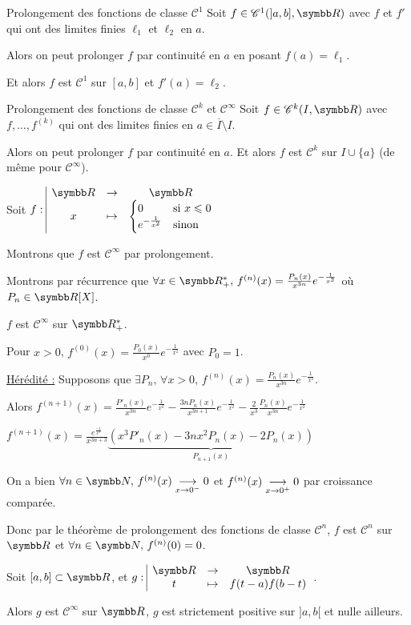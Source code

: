 \begin{theoreme}{Prolongement des fonctions de classe $\mathscr C^1$}{}
    Soit $f \in \mathscr C^1(]a, b], \R)$ avec $f$ et $f'$ qui ont des limites finies 
    $\ell_1$ et $\ell_2$ en $a$. 

    Alors on peut prolonger $f$ par continuité en $a$ en posant $f(a) = \ell_1$.

    Et alors $f$ est $\mathscr C^1$ sur $[a, b]$ et $f'(a) = \ell_2$.
\end{theoreme}

\begin{theoreme}{Prolongement des fonctions de classe $\mathscr C^k$ et $\mathscr C^{\infty}$}{}
    Soit $f \in \mathscr C^k(I, \R)$ avec $f,\dots,f^{(k)}$ qui ont des limites finies en $a \in \overline{I} \setminus I$. 

    Alors on peut prolonger $f$ par continuité en $a$.
    Et alors $f$ est $\mathscr C^k$ sur $I \cup \{a\}$ (de même pour $\mathscr C^{\infty}$).
\end{theoreme}

\begin{exemple}
    Soit $\fonction f \R \R x {\begin{cases}
        0 & \text{si } x \leqslant 0\\
        e^{-\frac{1}{x^2}} & \text{sinon}
    \end{cases}}$

    Montrons que $f$ est $\mathscr C^{\infty}$ par prolongement.

    Montrons par récurrence que $\forall x \in \R_+^*, \, f^{(n)}(x) = \frac{P_n(x) }{x^{3n}} e^{-\frac{1}{x^2}}$ où $P_n \in \R [X]$. 

    $f$ est $\mathscr C^\infty$ sur $\R_+^*$. 

    Pour $x > 0$, $f^{(0)}(x) = \frac{P_0(x )}{x^0} e^{-\frac{1}{x^2}}$ avec $P_0 = 1$.

    \uline{Hérédité :} Supposons que $\displaystyle \exists P_n, \, \forall x > 0, \, f^{(n)}(x) = \frac{P_n(x)}{x^{3n}} e^{-\frac{1}{x^2}}$.

    Alors $\displaystyle f^{(n+1)}(x) = \frac{P'_n(x)}{x^{3n}} e^{-\frac{1}{x^2}}  - \frac{3n P_n(x)}{x^{3n + 1}}e^{-\frac{1}{x^2}} - \frac 2 {x^3} \frac{P_n(x)}{x^{3n}}e^{-\frac{1}{x^2}}$

    $f^{(n+1)}(x) = \frac{e^{\frac{-1}{x^2}}}{x^{3n + 3}} \underbrace{\left( x^3 P'_n(x) - 3nx^2 P_n(x) - 2P_n(x) \right)}_{P_{n+1}(x)}$

    On a bien $\forall n \in \N, \, f^{(n)}(x) \limit x {0^-} 0 $ et $f^{(n)}(x) \underset{x \to 0^+}{\longrightarrow} 0$ par croissance comparée. 

    Donc par le théorème de prolongement des fonctions de classe $\mathscr C^n$, $f$ est $\mathscr C^n$ sur $\R$ et $\forall n \in \N, \, f^{(n)}(0) = 0$.


    Soit $[a, b] \subset \R$, et $\fonction g \R \R t {f(t-a)f(b-t)}$.

    Alors $g$ est $\mathscr C^\infty$ sur $\R$, $g$ est strictement positive sur $]a, b[$ et nulle ailleurs.
\end{exemple}

